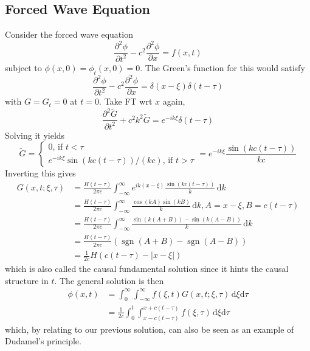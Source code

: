 \subsection{Forced Wave Equation}
Consider the forced wave equation
$$\frac{\partial^2\phi}{\partial t^2}-c^2\frac{\partial^2\phi}{\partial x}=f(x,t)$$
subject to $\phi(x,0)=\phi_t(x,0)=0$.
The Green's function for this would satisfy
$$\frac{\partial^2\phi}{\partial t^2}-c^2\frac{\partial^2\phi}{\partial x}=\delta(x-\xi)\delta(t-\tau)$$
with $G=G_t=0$ at $t=0$.
Take FT wrt $x$ again,
$$\frac{\partial^2\tilde{G}}{\partial t^2}+c^2k^2\tilde{G}=e^{-ik\xi}\delta(t-\tau)$$
Solving it yields
$$\tilde{G}=\begin{cases}
    0\text{, if $t<\tau$}\\
    e^{-ik\xi}\sin(kc(t-\tau))/(kc)\text{, if $t>\tau$}
\end{cases}=e^{-ik\xi}\frac{\sin(kc(t-\tau))}{kc}$$
Inverting this gives
\begin{align*}
    G(x,t;\xi,\tau)&=\frac{H(t-\tau)}{2\pi c}\int_{-\infty}^\infty e^{ik(x-\xi)}\frac{\sin(kc(t-\tau))}{k}\,\mathrm dk\\
    &=\frac{H(t-\tau)}{2\pi c}\int_{-\infty}^\infty \frac{\cos(kA)\sin(kB)}{k}\,\mathrm dk,A=x-\xi,B=c(t-\tau)\\
    &=\frac{H(t-\tau)}{2\pi c}\int_{-\infty}^\infty \frac{\sin(k(A+B))-\sin(k(A-B))}{k}\,\mathrm dk\\
    &=\frac{H(t-\tau)}{2\pi c}(\operatorname{sgn}(A+B)-\operatorname{sgn}(A-B))\\
    &=\frac{1}{2c}H(c(t-\tau)-|x-\xi|)
\end{align*}
which is also called the causal fundamental solution since it hints the causal structure in $t$.
The general solution is then
\begin{align*}
    \phi(x,t)&=\int_0^\infty\int_{-\infty}^\infty f(\xi,t)G(x,t;\xi,\tau)\,\mathrm d\xi\mathrm d\tau\\
    &=\frac{1}{2c}\int_0^t\int_{x-c(t-\tau)}^{x+c(t-\tau)}f(\xi,\tau)\,\mathrm d\xi\mathrm d\tau
\end{align*}
which, by relating to our previous solution, can also be seen as an example of Dudamel's principle.
